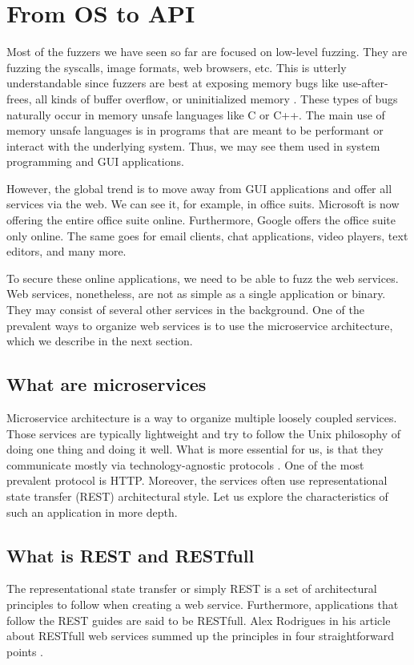 \chapter{From OS to API}
Most of the fuzzers we have seen so far are focused on low-level fuzzing. They are fuzzing the syscalls, image formats, web browsers, etc. This is utterly understandable since fuzzers are best at exposing memory bugs like use-after-frees, all kinds of buffer overflow, or uninitialized memory \cite{chang2017oss}. These types of bugs naturally occur in memory unsafe languages like C or C++. The main use of memory unsafe languages is in programs that are meant to be performant or interact with the underlying system. Thus, we may see them used in system programming and GUI applications.

However, the global trend is to move away from GUI applications and offer all services via the web. We can see it, for example, in office suits. Microsoft is now offering the entire office suite online. Furthermore, Google offers the office suite only online. The same goes for email clients, chat applications, video players, text editors, and many more.

To secure these online applications, we need to be able to fuzz the web services. Web services, nonetheless, are not as simple as a single application or binary. They may consist of several other services in the background. One of the prevalent ways to organize web services is to use the microservice architecture, which we describe in the next section.

\section{What are microservices}
Microservice architecture is a way to organize multiple loosely coupled services. Those services are typically lightweight and try to follow the Unix philosophy of doing one thing and doing it well. What is more essential for us, is that they communicate mostly via technology-agnostic protocols \cite{nadareishvili2016microservice}. One of the most prevalent protocol is HTTP. Moreover, the services often use representational state transfer (REST) architectural style. Let us explore the characteristics of such an application in more depth.

\section{What is REST and RESTfull}
The representational state transfer or simply REST is a set of architectural principles to follow when creating a web service. Furthermore, applications that follow the REST guides are said to be RESTfull. Alex Rodrigues in his article about RESTfull web services summed up the principles in four straightforward points \cite{rodriguez2008restful}.

